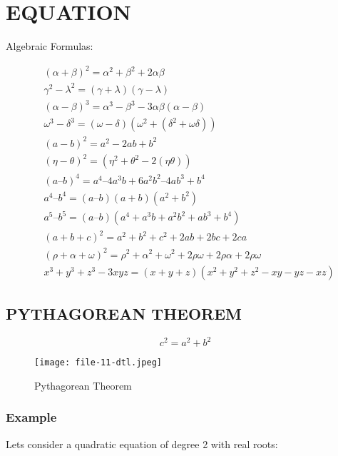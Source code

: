 \documentclass{article}
\begin{document}
\section{EQUATION}
Algebraic Formulas:\cite{2}

\begin{align}
	&({\alpha}+{\beta})^2 = {\alpha}^2 + {\beta}^2 + 2{\alpha}{\beta}\\
	&{\gamma}^2 - {\lambda}^2 = ({\gamma}+{\lambda})({\gamma}-{\lambda}) \\
	&({\alpha}-{\beta})^3 = {\alpha}^3 - {\beta}^3 - 3{\alpha}{\beta}({\alpha}-{\beta})\\
	&{\omega}^3 - {\delta}^3 = ({\omega}-{\delta})({\omega}^2+ ({\delta}^2+{\omega}{\delta})) \\
	&(a-b)^2 = a^2 - 2ab + b^2 \\
	&({\eta}-{\theta})^2 = ({\eta}^2 + {\theta}^2 - 2({\eta}{\theta})) \\
	&(a – b)^4 = a^4 – 4a^3b + 6a^2b^2 – 4ab^3 + b^4\\
	&a^4 – b^4 = (a – b)(a + b)(a^2 + b^2)\\
	&a^5 – b^5 = (a – b)(a^4 + a^3b + a^2b^2 + ab^3 + b^4)\\
	&(a +b+ c)^2=a^2+b^2+c^2+2ab+2bc+2ca\\
	&({\rho}+ {\alpha}+ {\omega})^2={\rho}^2+{\alpha}^2+{\omega}^2+2{\rho}{\omega}+2{\rho}{\alpha}+2{\rho}{\omega}\\
	&x^3 + y^3 + z^3 - 3xyz = (x + y + z)(x^2 + y^2 + z^2 - xy - yz - xz)
\end{align}


\subsection{PYTHAGOREAN THEOREM}
\[
c^2 = a^2 + b^2
\]
\begin{figure}
\texttt{[image: file-11-dtl.jpeg]}
\caption{Pythagorean Theorem}
\label{fig:Pythagorean Diagram}
\end{figure}

\subsubsection{Example}
Lets consider a quadratic equation of degree 2 with real roots:
\end{document}
